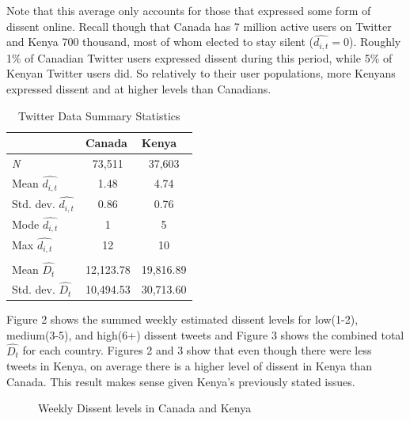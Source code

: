 \documentclass[12pt]{article}
\begin{document}
\begin{spacing}{1.5}
Note that this average only accounts for those that expressed some form of dissent online. Recall though that Canada has 7 million active users on Twitter and Kenya 700 thousand, most of whom elected to stay silent ($\hat{d_{i,t}}=0$). Roughly 1\% of Canadian Twitter users expressed dissent during this period, while 5\% of Kenyan Twitter users did. So relatively to their user populations, more Kenyans expressed dissent and at higher levels than Canadians.      

\begin{table}[]
\centering
\begin{tabular}{lcc}
\toprule
\multicolumn{1}{l}{} & \multicolumn{1}{l}{\textbf{Canada}} & \multicolumn{1}{l}{\textbf{Kenya}} \\ \hline
\textit{N} & 73,511 & 37,603 \\
Mean $\hat{d_{i,t}}$ & 1.48 & 4.74 \\
Std. dev. $\hat{d_{i,t}}$ & 0.86 & 0.76 \\
Mode $\hat{d_{i,t}}$ & 1 & 5 \\
Max $\hat{d_{i,t}}$ & 12 & 10 \\
& & \\
Mean $\hat{D_t}$ & 12,123.78 & 19,816.89 \\
Std. dev. $\hat{D_t}$ & 10,494.53 & 30,713.60 \\
\hline
\end{tabular}
\caption{Twitter Data Summary Statistics}
\end{table}

Figure 2 shows the summed weekly estimated dissent levels for low(1-2), medium(3-5), and high(6+) dissent tweets and Figure 3 shows the combined total $\hat{D_t}$ for each country. Figures 2 and 3 show that even though there were less tweets in Kenya, on average there is a higher level of dissent in Kenya than Canada. This result makes sense given Kenya's previously stated issues. 

\begin{figure}[htb]
\centering 
{}
\caption{Weekly Dissent levels in Canada and Kenya}
\end{figure}


\end{spacing}
\end{document}
